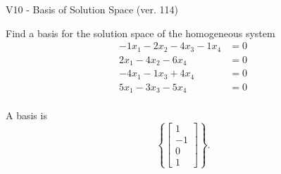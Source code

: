 \begin{exercise}
  \begin{exerciseTitle}V10 - Basis of Solution Space (ver. 114)\end{exerciseTitle}
  \begin{exerciseStatement}
    Find a basis for the solution space of the homogeneous system 
\begin{align*}
 -1 x_ 1 -2 x_ 2 -4 x_ 3 -1 x_ 4 &= 0  \\ 
  2 x_ 1 -4 x_ 2 -6 x_ 4 &= 0  \\ 
  -4 x_ 1 -1 x_ 3 + 4 x_ 4 &= 0  \\ 
  5 x_ 1 -3 x_ 3 -5 x_ 4 &= 0  \\ 
 \end{align*}


 
  \end{exerciseStatement}

  \begin{exerciseAnswer}
   A basis is   
\[\left\{\left[\begin{array}{c}
1 \\
-1 \\
0 \\
1
\end{array}\right]\right\}.\]

  


  \end{exerciseAnswer}
\end{exercise}